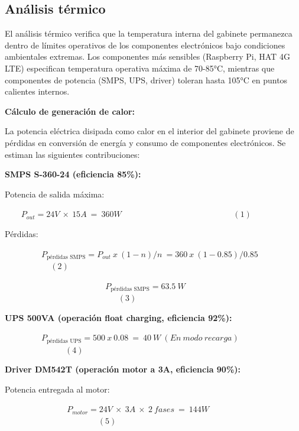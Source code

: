 \documentclass[12pt,a4paper,oneside]{report}
\begin{document}
\subsection{Análisis térmico}\label{anuxe1lisis-tuxe9rmico}

El análisis térmico verifica que la temperatura interna del gabinete permanezca dentro de límites operativos de los componentes electrónicos bajo condiciones ambientales extremas. Los componentes más sensibles (Raspberry Pi, HAT 4G LTE) especifican temperatura operativa máxima de 70-85°C, mientras que componentes de potencia (SMPS, UPS, driver) toleran hasta 105°C en puntos calientes internos.

\textbf{Cálculo de generación de calor:}

La potencia eléctrica disipada como calor en el interior del gabinete proviene de pérdidas en conversión de energía y consumo de componentes electrónicos. Se estiman las siguientes contribuciones:

\textbf{SMPS S-360-24 (eficiencia 85\%):}

Potencia de salida máxima:

\(\ \ \ \ \ \ \ \ \ P_{out} = 24V\  \times \ 15A\  = \ 360W\)\(\ \ \ \ \ \ \ \ \ \ \ \ \ \ \ \ \ \ \ \ \ \ \ \ \ \ \ \ \ \ \ \ \ \ \ \ \ \ \ \ \ \ \ \ \ \ \ \ \ \ \ \ \ \ \ \ \ \ \ \ \ (1)\ \)

Pérdidas:

\(\ \ \ \ \ \ \ \ \ \ \ \ \ \ \ \ \ \ \ \ P_{\text{pérdidas SMPS}} = P_{out}\ x\ (1 - n)/n\  = 360\ x\ (1 - 0.85)/0.85\)\(\ \ \ \ \ \ \ \ \ \ \ \ \ \ \ \ \ \ \ \ \ \ \ \ \ (2)\ \)

\(\ \ \ \ \ \ \ \ \ \ \ \ \ \ \ \ \ \ \ \ \ \ \ \ \ \ \ \ \ \ \ \ \ \ \ \ \ \ \ \ \ \ \ \ \ \ \ \ \ \ \ \ \ \ \ P_{\text{pérdidas SMPS}} = 63.5\ W\)\(\ \ \ \ \ \ \ \ \ \ \ \ \ \ \ \ \ \ \ \ \ \ \ \ \ \ \ \ \ \ \ \ \ \ \ \ \ \ \ \ \ \ \ \ \ \ \ \ \ \ \ \ \ \ \ \ \ \ \ \ \ \ (3)\ \)

\textbf{UPS 500VA (operación float charging, eficiencia 92\%):}

\(\ \ \ \ \ \ \ \ \ \ \ \ \ \ \ \ \ \ \ \ P_{\text{pérdidas UPS}} = 500\ x\ 0.08\  = \ 40\ W\ (En\ modo\ recarga)\)\(\ \ \ \ \ \ \ \ \ \ \ \ \ \ \ \ \ \ \ \ \ \ \ \ \ \ \ \ \ \ \ \ \ (4)\ \)

\textbf{Driver DM542T (operación motor a 3A, eficiencia 90\%):}

Potencia entregada al motor:

\(\ \ \ \ \ \ \ \ \ \ \ \ \ \ \ \ \ \ \ \ \ \ \ \ \ \ \ \ \ \ \ \ \ \ P_{motor} = 24V\  \times \ 3A\  \times \ 2\ fases\  = \ 144W\)\(\ \ \ \ \ \ \ \ \ \ \ \ \ \ \ \ \ \ \ \ \ \ \ \ \ \ \ \ \ \ \ \ \ \ \ \ \ \ \ \ \ \ \ \ \ \ \ \ \ \ \ (5)\ \)
\end{document}
